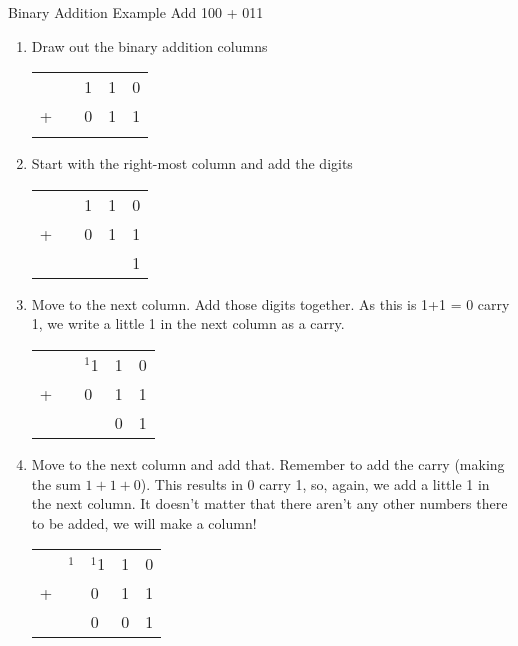 \begin{example}{Binary Addition Example}
Add 100 + 011
\begin{enumerate}
    \item Draw out the binary addition columns
    \begin{table}[H]
        \centering
        \begin{tabularx}{0.2\textwidth}{XXXXX}
             &  & 1 & 1 & 0 \\
            + &  & 0 & 1 & 1 \\
            \hline
            &  &  &  &  
        \end{tabularx}
    \end{table}
    \item Start with the right-most column and add the digits
    \begin{table}[H]
        \centering
        \begin{tabularx}{0.2\textwidth}{XXXXX}
             &  & 1 & 1 & 0 \\
            + &  & 0 & 1 & 1 \\
            \hline
            &  &  &  & 1 
        \end{tabularx}
    \end{table}
    \item Move to the next column. Add those digits together. As this is 1+1 = 0 carry 1, we write a little 1 in the next column as a carry.
    \begin{table}[H]
        \centering
        \begin{tabularx}{0.2\textwidth}{XXXXX}
             &  & $^1$1 & 1 & 0 \\
            + &  & 0 & 1 & 1 \\
            \hline
            &  &  & 0 & 1 
        \end{tabularx}
    \end{table}
    \item Move to the next column and add that. Remember to add the carry (making the sum $1+1+0$). This results in 0 carry 1, so, again, we add a little 1 in the next column. It doesn't matter that there aren't any other numbers there to be added, we will make a column!
    \begin{table}[H]
        \centering
        \begin{tabularx}{0.2\textwidth}{XXXXX}
             & $^1$ & $^1$1 & 1 & 0 \\
            + &  & 0 & 1 & 1 \\
            \hline
            &  & 0 & 0 & 1 

\end{tabularx}
\end{table}
\end{enumerate}
\end{example}
